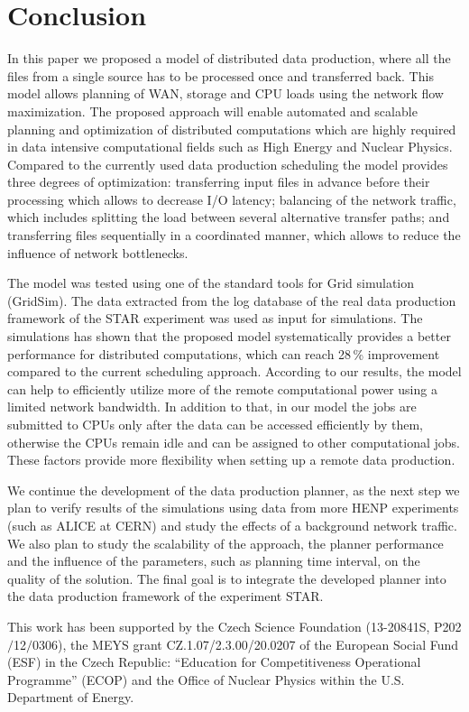 \documentclass{svjour3}                     %
\begin{document}
\section{Conclusion}
\label{Conclusion}

In this paper we proposed a model of distributed data production, where all
the files from a single source has to be processed once and transferred back.
This model allows planning of WAN, storage and CPU loads using the network
flow maximization. The proposed approach will enable automated and scalable planning and optimization of distributed computations which are highly required in data intensive computational fields such as High Energy and Nuclear Physics. Compared to the currently used data production scheduling the model provides three degrees of optimization: transferring input files in advance before their processing which allows to decrease I/O latency; balancing of the network traffic, which includes splitting the load between several alternative transfer paths; and transferring files sequentially in a coordinated manner, which allows to reduce the influence of network bottlenecks.

The model was tested using one of the standard tools for Grid simulation (GridSim). The data extracted from the log database of the real data production framework of the STAR experiment was used as input for simulations. The simulations has shown that the proposed model systematically provides a better performance for distributed computations, which can reach 28\,\% improvement compared to the current scheduling approach. According to our results, the model can help to efficiently utilize more of the remote computational power using a limited network bandwidth. In addition to that, in our model the jobs are submitted to CPUs only after the data can be accessed efficiently by them, otherwise the CPUs remain idle and can be assigned to other computational jobs. These factors provide more flexibility when setting up a remote data production.

We continue the development of the data production planner, as the next step we plan to verify results of the simulations using data from more HENP experiments (such as ALICE at CERN) and study the effects of a background network traffic. We also plan to study the scalability of the approach, the planner performance and the influence of the parameters, such as planning time interval, on the quality of the solution. The final goal is to integrate the developed planner into the data production framework of the experiment STAR.


\begin{acknowledgements}
This work has been supported by the Czech Science Foundation
(13-20841S, P202$/$12$/$0306),  the MEYS grant CZ.1.07/2.3.00/20.0207 of the European Social Fund (ESF) in the Czech Republic: “Education for Competitiveness Operational Programme” (ECOP) and the Office of Nuclear Physics within the U.S. Department of Energy.  
\end{acknowledgements}

{}

\end{document}
